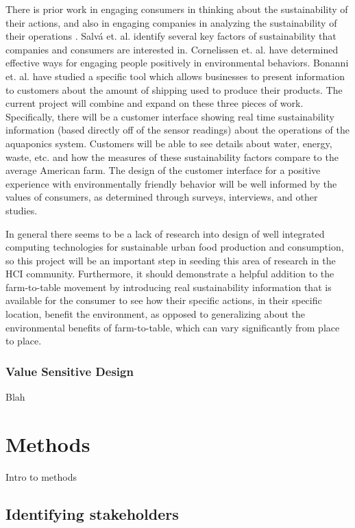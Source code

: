 \documentclass{sigchi}
\begin{document}
There is prior work \cite{smallBusiness, cueing} in engaging consumers in thinking about the sustainability of their actions, and also in engaging companies in analyzing the sustainability of their operations \cite{smallBusiness, audit}. Salv\'a et. al. identify several key factors of sustainability that companies and consumers are interested in. Cornelissen et. al. have determined effective ways for engaging people positively in environmental behaviors. Bonanni et. al. have studied a specific tool which allows businesses to present information to customers about the amount of shipping used to produce their products. The current project will combine and expand on these three pieces of work. Specifically, there will be a customer interface showing real time sustainability information (based directly off of the sensor readings) about the operations of the aquaponics system. Customers will be able to see details about water, energy, waste, etc. and how the measures of these sustainability factors compare to the average American farm. The design of the customer interface for a positive experience with environmentally friendly behavior will be well informed by the values of consumers, as determined through surveys, interviews, and other studies. 

In general there seems to be a lack of research into design of well integrated computing technologies for sustainable urban food production and consumption, so this project will be an important step in seeding this area of research in the HCI community. Furthermore, it should demonstrate a helpful addition to the farm-to-table movement by introducing real sustainability information that is available for the consumer to see how their specific actions, in their specific location, benefit the environment, as opposed to generalizing about the environmental benefits of farm-to-table, which can vary significantly from place to place.

\subsubsection{Value Sensitive Design}
Blah~\cite{VSD}\cite{moreVSD}

\section{Methods}

Intro to methods

\subsection{Identifying stakeholders}
\end{document}
